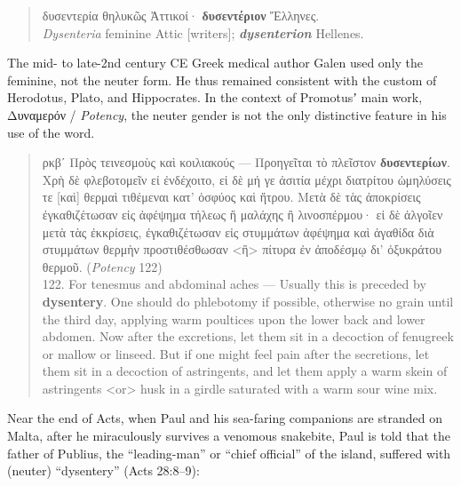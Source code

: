 \vfill{}
 \begin{quote}δυσεντερία θηλυκῶς Ἀττικοί· \textbf{δυσεντέριον} Ἕλληνες. \\[1mm] %
 \textit{Dysenteria} feminine Attic [writers]; \textit{\textbf{dysenterion}} Hellenes. %
 \end{quote} %
 \vfill{}

The mid- to late-2nd century CE Greek medical author Galen %
used only the feminine, not the neuter form. %
He thus remained consistent with the custom of Herodotus, %
Plato, and Hippocrates. \clearpage %
In the context of Promotusʼ main work, %
Δυναμερόν / \textit{Potency}, %
the neuter gender is not the only distinctive feature %
in his use of the word. %

\vspace*{3mm} 
 \begin{quote}ρκβʹ Πρὸς τεινεσμοὺς καὶ κοιλιακούς --- %
 Προηγεῖται τὸ πλεῖστον \textbf{δυσεντερίων}. Χρὴ δὲ φλεβοτομεῖν εἰ ἐνδέχοιτο, %
 εἰ δὲ μή γε ἀσιτία μέχρι διατρίτου ὠμηλύσεις τε [καὶ] θερμαὶ τιθέμεναι %
 κατ’ ὀσφύος καὶ ἤτρου. Μετὰ δὲ τὰς ἀποκρίσεις ἐγκαθιζέτωσαν εἰς ἀφέψημα %
 τήλεως ἢ μαλάχης ἢ λινοσπέρμου· εἰ δὲ ἀλγοῖεν μετὰ τὰς ἐκκρίσεις,
 ἐγκαθιζέτωσαν εἰς στυμμάτων ἀφέψημα καὶ ἀγαθίδα διὰ στυμμάτων θερμὴν %
 προστιθέσθωσαν <ἢ> πίτυρα ἐν ἀποδέσμῳ δι’ ὀξυκράτου θερμοῦ. (\textit{Potency} 122) \\[1mm] %
 122. For tenesmus and abdominal aches --- %
 Usually this is preceded by \textbf{dysentery}. One should do phlebotomy if possible, %
 otherwise no grain until the third day, applying warm poultices %
 upon the lower back and lower abdomen. Now after the excretions, %
 let them sit in a decoction of fenugreek or mallow or linseed. %
 But if one might feel pain after the secretions, %
 let them sit in a decoction of astringents, %
 and let them apply a warm skein of astringents <or> %
 husk in a girdle saturated with a warm sour wine mix. \end{quote} %
 \vspace*{3mm}

Near the end of Acts, when Paul and his sea-faring companions %
are stranded on Malta, %
after he miraculously survives a venomous snakebite, %
Paul is told that the father of Publius, %
the “leading-man” or “chief official” of the island, %
suffered with (neuter) “dysentery” (Acts 28:8--9): %


